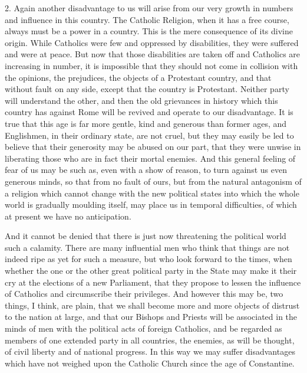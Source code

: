 2. Again another disadvantage to us will arise
from our very growth in numbers and influence in this country. The
Catholic Religion, when it has a free course, always must be a power
in a country. This is the mere consequence of its divine origin. While
Catholics were few and oppressed by disabilities, they were suffered
and were at peace. But now that those disabilities are taken off and
Catholics are increasing in number, it is impossible that they should
not come in collision with the opinions, the prejudices, the objects
of a Protestant country, and that without fault on any side, except
that the country is Protestant. Neither party will understand the
other, and then the old grievances in history which this country has
against Rome will be revived and operate to our disadvantage. It is
true that this age is far more gentle, kind and generous than former
ages, and Englishmen, in their ordinary state, are not cruel, but they
may easily be led to believe that their generosity may be abused on
our part, that they were unwise in liberating those who are in fact
their mortal enemies. And this general feeling of fear of us may be
such as, even with a show of reason, to turn against us even generous
minds, so that from no fault of ours, but from the natural antagonism
of a religion which cannot change with the new political states into
which the whole world is gradually moulding itself, may place us in
temporal difficulties, of which at present we have no anticipation.

And it cannot be denied that there is just now
threatening the political world such a calamity. There are many
influential men who think that things are not indeed ripe as yet for
such a measure, but who look forward to the times, when whether the
one or the other great political party in the State may make it their
cry at the elections of a new Parliament, that they propose to lessen
the influence of Catholics and circumscribe their privileges. And
however this may be, two things, I think, are plain, that we shall
become more and more objects of distrust to the nation at large, and
that our Bishops and Priests will be associated in the minds of men
with the political acts of foreign Catholics, and be regarded as
members of one extended party in all countries, the enemies, as will
be thought, of civil liberty and of national progress. In this way we
may suffer disadvantages which have not weighed upon the Catholic
Church since the age of Constantine.


